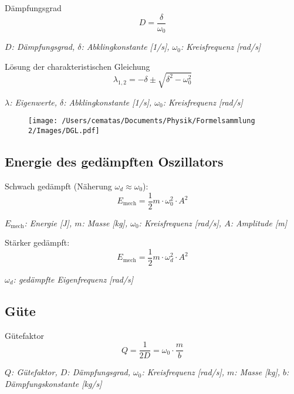 \documentclass[a4paper,10pt]{article}
\newenvironment{displayformula}
{
	\begin{framed}
		\color{formulaColor}
	}
	{\end{framed}}
\newcommand{\formulalegend}[1]{%
	\par\vspace{0.5ex}%
	{{\color{legendColor}\RaggedRight\small\textit{#1}}}%
	\par\vspace{1.5ex}%
}
\begin{document}
\begin{displayformula}
	Dämpfungsgrad
	\[
	D = \frac{\delta}{\omega_0}
	\]
\end{displayformula}
\formulalegend{
	\( D \): Dämpfungsgrad, \( \delta \): Abklingkonstante [1/s], \( \omega_0 \): Kreisfrequenz [rad/s]
}

\begin{displayformula}
	Lösung der charakteristischen Gleichung
	\[
	\lambda_{1,2} = -\delta \pm \sqrt{\delta^2 - \omega_0^2}
	\]
\end{displayformula}
\formulalegend{
	\( \lambda \): Eigenwerte, \( \delta \): Abklingkonstante [1/s], \( \omega_0 \): Kreisfrequenz [rad/s]
}

\begin{figure}[h!]
	\centering
	\texttt{[image: /Users/cematas/Documents/Physik/Formelsammlung 2/Images/DGL.pdf]}
\end{figure}

\subsection{Energie des gedämpften Oszillators}

\begin{displayformula}
	Schwach gedämpft (Näherung \( \omega_d \approx \omega_0 \)):
	\[
	E_{\text{mech}} = \frac{1}{2} m \cdot \omega_0^2 \cdot A^2
	\]
\end{displayformula}
\formulalegend{
	\( E_{\text{mech}} \): Energie [J], \( m \): Masse [kg], \( \omega_0 \): Kreisfrequenz [rad/s], \( A \): Amplitude [m]
}

\begin{displayformula}
	Stärker gedämpft:
	\[
	E_{\text{mech}} = \frac{1}{2} m \cdot \omega_d^2 \cdot A^2
	\]
\end{displayformula}
\formulalegend{
	\( \omega_d \): gedämpfte Eigenfrequenz [rad/s]
}

\subsection{Güte}

\begin{displayformula}
	Gütefaktor
	\[
	Q = \frac{1}{2D} = \omega_0 \cdot \frac{m}{b}
	\]
\end{displayformula}
\formulalegend{
	\( Q \): Gütefaktor, \( D \): Dämpfungsgrad, \( \omega_0 \): Kreisfrequenz [rad/s], \( m \): Masse [kg], \( b \): Dämpfungskonstante [kg/s]
}
\end{document}
